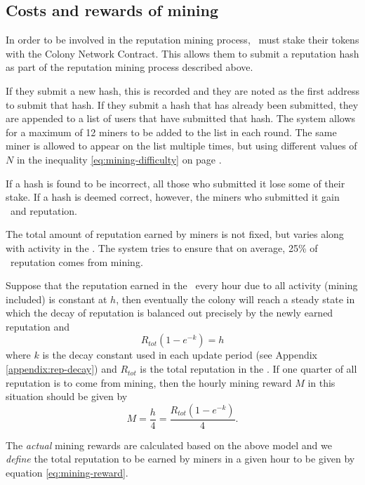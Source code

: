 \subsection{Costs and rewards of mining}\label{subsec:mining-costs-and-rewards}
In order to be involved in the reputation mining process, \rcths\ must stake their tokens with the Colony Network Contract. This allows them to submit a reputation hash as part of the reputation mining process described above.

If they submit a new hash, this is recorded and they are noted as the first address to submit that hash. If they submit a hash that has already been submitted, they are appended to a list of users that have submitted that hash. The system allows for a maximum of 12 miners to be added to the list in each round. The same miner is allowed to appear on the list multiple times, but using different values of $N$ in the inequality \eqref{eq:mining-difficulty} on page \pageref{eq:mining-difficulty}.

If a hash is found to be incorrect, all those who submitted it lose some of their stake. If a hash is deemed correct, however, the miners who submitted it gain \rcts\ and reputation.

The total amount of reputation earned by miners is not fixed, but varies along with activity in the \rc. The system tries to ensure that on average, 25\% of \rc\ reputation comes from mining. %

Suppose that the reputation earned in the \rc\ every hour due to all activity (mining included) is constant at $h$, then eventually the colony will reach a steady state in which the decay of reputation is balanced out precisely by the newly earned reputation and
\begin{equation}
 R_{tot} \left( 1 - e^{-k} \right) = h
\end{equation}
\noindent where $k$ is the decay constant used in each update period (see Appendix \ref{appendix:rep-decay}) and $R_{tot}$ is the total reputation in the \rc. If one quarter of all reputation is to come from mining, then the hourly mining reward $M$ in this situation should be given by
\begin{equation}\label{eq:mining-reward}
 M = \frac{h}{4} = \frac{R_{tot} \left( 1 - e^{-k} \right)}{4}.
\end{equation}

The \emph{actual} mining rewards are calculated based on the above model and we \emph{define} the total reputation to be earned by miners in a given hour to be given by equation \eqref{eq:mining-reward}.


